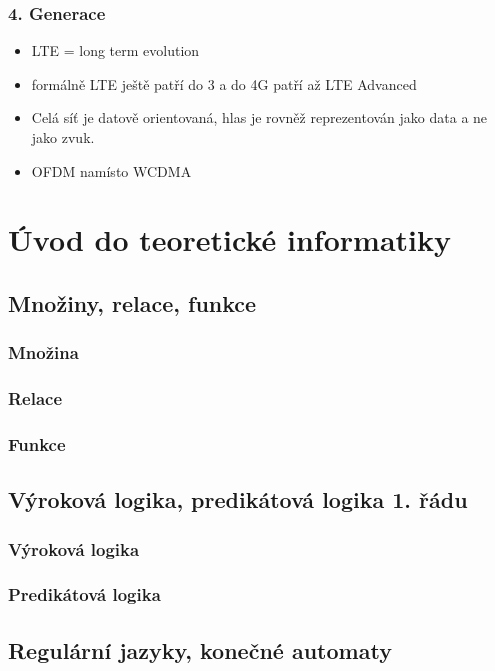 \documentclass[10pt,a4paper]{article}
\begin{document}
\subsubsection{4. Generace}

\begin{itemize}
\item LTE = long term evolution
\item formálně LTE ještě patří do 3 a do 4G patří až LTE Advanced
\item Celá síť je datově orientovaná, hlas je rovněž reprezentován jako data a ne jako zvuk.
\item OFDM namísto WCDMA
\end{itemize}

\newpage
\section{Úvod do teoretické informatiky}

\subsection{Množiny, relace, funkce}
\subsubsection{Množina}
\subsubsection{Relace}
\subsubsection{Funkce}

\subsection{Výroková logika, predikátová logika 1. řádu}
\subsubsection{Výroková logika}
\subsubsection{Predikátová logika}

\subsection{Regulární jazyky, konečné automaty}
\end{document}

